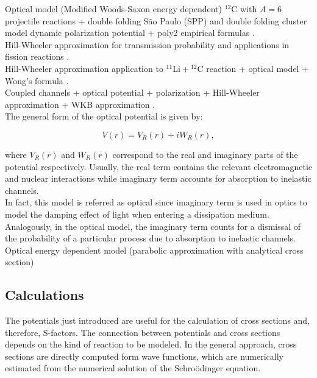\documentclass[openany]{book}
\begin{document}
Optical model (Modified Woods-Saxon energy dependent) $\mathrm{{}^{12}C}$ with $A = 6$ projectile reactions + double folding São Paulo (SPP)  and double folding cluster model dynamic polarization potential + poly2 empirical formulas \cite{amer_penionzhkevich_2021}. \\

Hill-Wheeler approximation for transmission probability and applications in fission reactions \cite{hill_wheeler_1953}. \\

Hill-Wheeler approximation  application to $\mathrm{{}^{11}Li + {}^{12}C}$ reaction + optical model + Wong's formula  \cite{esbensen_2012}. \\
 
Coupled channels + optical potential +  polarization +  Hill-Wheeler approximation  +  WKB approximation \cite{cardenas_canto_donangelo_hussein_lubian_romanelli_2002}. \\ 

The general form of the optical potential is given by:

\begin{equation}  \label{eq:potential_Optical}
	V(r) = V_R(r) + iW_R(r),
\end{equation}

where $V_R(r)$ and $W_R(r)$ correspond to the real and imaginary parts of the potential respectively. Usually, the real term contains the relevant electromagnetic and nuclear interactions while imaginary term accounts for absorption to inelastic channels. \\

In fact, this model is referred as optical since imaginary term is used in optics to model the damping effect of light when entering a dissipation medium. Analogously, in the optical model, the imaginary term counts for a dismissal of the probability of a particular process due to absorption to inelastic channels. \\

Optical energy dependent model (parabolic approximation with analytical cross section) \cite{singh_sukhvinder_kharab_2013B}

\subsection{Calculations}  \label{sub:potential_calculations}

The potentials just introduced are useful for the calculation of cross sections and, therefore, S-factors. The connection between potentials and cross sections depends on the kind of reaction to be modeled. In the general approach, cross sections are directly computed form wave functions,  which are numerically estimated from the numerical solution of the Schroödinger equation. \\
\end{document}

